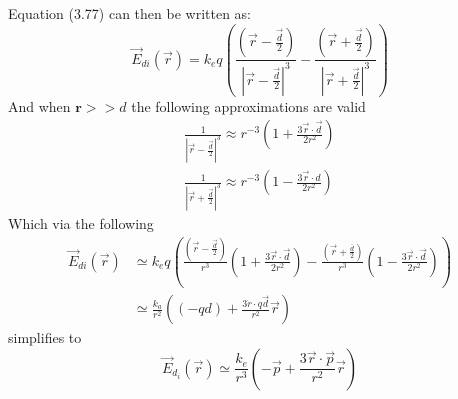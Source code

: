 Equation (3.77) can then be written as:
\begin{equation}
    \vec{E}_{d i}(\vec{r})=k_{e} q\left(\frac{\left(\vec{r}-\frac{\vec{d}}{2}\right)}{\left|\vec{r}-\frac{\vec{d}}{2}\right|^{3}}-\frac{\left(\vec{r}+\frac{\vec{d}}{2}\right)}{\left|\vec{r}+\frac{\vec{d}}{2}\right|^{3}}\right)
\end{equation}
And when $\textbf{r}>>d$ the following approximations are valid
\begin{equation}
    \begin{array}{l}
    \frac{1}{\left|\vec{r}-\frac{\vec{d}}{2}\right|^{3}} \approx r^{-3}\left(1+\frac{3 \vec{r} \cdot \vec{d}}{2 r^{2}}\right) \\
    \frac{1}{\left|\vec{r}+\frac{\vec{d}}{2}\right|^{3}} \approx r^{-3}\left(1-\frac{3 \vec{r} \cdot d}{2 r^{2}}\right)
    \end{array}
\end{equation}
Which via the following
\begin{equation}
    \begin{aligned}
        \vec{E}_{d i}(\vec{r}) &\simeq k_{e} q\left(\frac{\left(\vec{r}-\frac{\vec{d}}{2}\right)}{r^{3}}\left(1+\frac{3 \vec{r} \cdot \vec{d}}{2 r^{2}}\right)-\frac{\left(\vec{r}+\frac{\bar{d}}{2}\right)}{r^{3}}\left(1-\frac{3 \vec{r} \cdot \vec{d}}{2 r^{2}}\right)\right)\\
        &\simeq \frac{k_{a}}{r^{2}}\left((-q d)+\frac{3 \dot{r} \cdot q \vec{d}}{r^{2}} \vec{r}\right)    
    \end{aligned}
\end{equation}
simplifies to
\begin{equation}
    \vec{E}_{d_{i}}(\vec{r}) \simeq \frac{k_{e}}{r^{3}}\left(-\vec{p}+\frac{3 \vec{r} \cdot \vec{p}}{r^{2}} \vec{r}\right)
\end{equation}